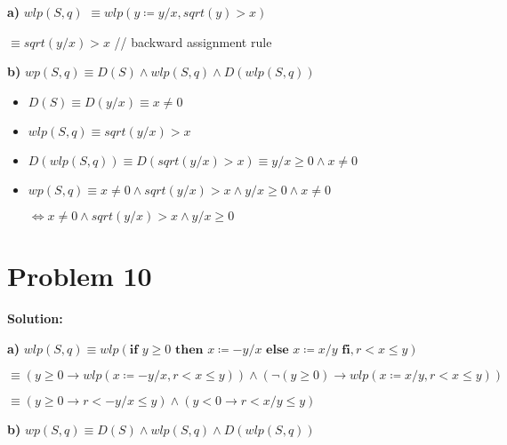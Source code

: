 \documentclass{article}
\begin{document}
\textbf{a)} $wlp(S,q)$ \qquad $\equiv wlp(y \coloneqq y/x,sqrt(y)>x)$

\qquad \qquad \qquad \qquad $\equiv sqrt(y/x)>x$ \qquad  \qquad  \qquad  \qquad // backward assignment rule

\vspace{10pt}
\textbf{b)} $wp(S,q) \equiv D(S) \wedge wlp(S,q) \wedge D(wlp(S,q))$

\begin{itemize}
    \item $D(S) \equiv D(y/x) \equiv x \neq 0$
    \item $wlp(S,q) \equiv sqrt(y/x)>x$
    \item $D(wlp(S,q)) \equiv D(sqrt(y/x)>x) \equiv y/x \geq 0 \wedge x \neq 0$
    \item $wp(S,q) \equiv x \neq 0 \wedge sqrt(y/x)>x \wedge y/x \geq 0 \wedge x \neq 0$

\qquad \qquad $\Leftrightarrow x \neq 0 \wedge sqrt(y/x)>x \wedge y/x \geq 0$
\end{itemize}

\section*{Problem 10}
\textbf{Solution:}

\textbf{a)} $wlp(S,q) \equiv wlp(\textbf{if } y \geq 0 \textbf{ then } x \coloneqq -y/x \textbf{ else } x \coloneqq x/y \textbf{ fi}, r<x \leq y)$

\qquad \qquad \qquad $\equiv (y \geq 0 \rightarrow wlp(x \coloneqq -y/x, r<x \leq y)) \wedge (\neg(y \geq 0) \rightarrow wlp(x \coloneqq x/y, r<x \leq y))$

\qquad \qquad \qquad $\equiv (y \geq 0 \rightarrow r<-y/x \leq y) \wedge (y < 0 \rightarrow r<x/y \leq y)$

\vspace{10pt}
\textbf{b)} $wp(S,q) \equiv D(S) \wedge wlp(S,q) \wedge D(wlp(S,q))$
\end{document}
